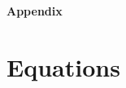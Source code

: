 \documentclass[12pt]{article}%
\begin{document}









\newpage
\appendix
{\Large \textbf{Appendix}}
\section{Equations}
\end{document}
